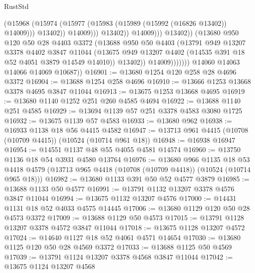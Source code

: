 \begin{lexlean}{RustStd}
\begin{coremodule}
                                        (@15968
                                          (@15974
                                            (@15977
                                              (@15983 (@15989 (@15992 (@16826 @13402)) @14009)))
                                            @13402))
                                        @14009)))
                                  @13402))
                              @14009)))
                        @13402))
                    (@13680
                      @950
                      @120
                      @50
                      @28
                      @4403
                      @3372
                      (@13688
                        @950
                        @50
                        @4403
                        (@13791
                          @949
                          @13207
                          @3378
                          @4402
                          @3847
                          @11044
                          (@13675 @949 @13207 @4402 (@14535 @391 @18 @52 @4051 @3879 @14549 @14010))
                          @13402))
                      @14009)))))))
        @14060
        @14063
        @14066
        @14069
        @10687))
@16901 := @13680 @1254 @120 @258 @28 @4696 @3372
@16904 := @13688 @1254 @258 @4696
@16910 := @13666 @1253 @13668 @3378 @4695 @3847 @11044
@16913 := @13675 @1253 @13668 @4695
@16919 := @13680 @1140 @1252 @251 @260 @4585 @4694
@16922 := @13688 @1140 @251 @4585
@16929 := @13694 @1139 @57 @251 @3378 @4583 @3080 @1725
@16932 := @13675 @1139 @57 @4583
@16933 := @13680 @962
@16938 := @16933 @1138 @18 @56 @4415 @4582
@16947 := @13713 @961 @4415 (@10708 (@10709 @4415)) (@10524 (@10714 @961 @18))
@16948 := @16938 @16947
@16954 := @14551 @1137 @48 @55 @4055 @4581 @14574
@16960 := @13750 @1136 @18 @54 @3931 @4580 @13764
@16976 := @13680
    @966
    @1135
    @18
    @53
    @4418
    @4579
    (@13713 @965 @4418 (@10708 (@10709 @4418)) (@10524 (@10714 @965 @18)))
@16982 := @13680 @1133 @391 @50 @52 @4577 @3879
@16985 := @13688 @1133 @50 @4577
@16991 := @13791 @1132 @13207 @3378 @4576 @3847 @11044
@16994 := @13675 @1132 @13207 @4576
@17000 := @14431 @1131 @18 @52 @4033 @4575 @14445
@17006 := @13680 @1129 @120 @50 @28 @4573 @3372
@17009 := @13688 @1129 @50 @4573
@17015 := @13791 @1128 @13207 @3378 @4572 @3847 @11044
@17018 := @13675 @1128 @13207 @4572
@17024 := @14640 @1127 @18 @52 @4061 @4571 @14654
@17030 := @13680 @1125 @120 @50 @28 @4569 @3372
@17033 := @13688 @1125 @50 @4569
@17039 := @13791 @1124 @13207 @3378 @4568 @3847 @11044
@17042 := @13675 @1124 @13207 @4568

\end{coremodule}
\end{lexlean}
